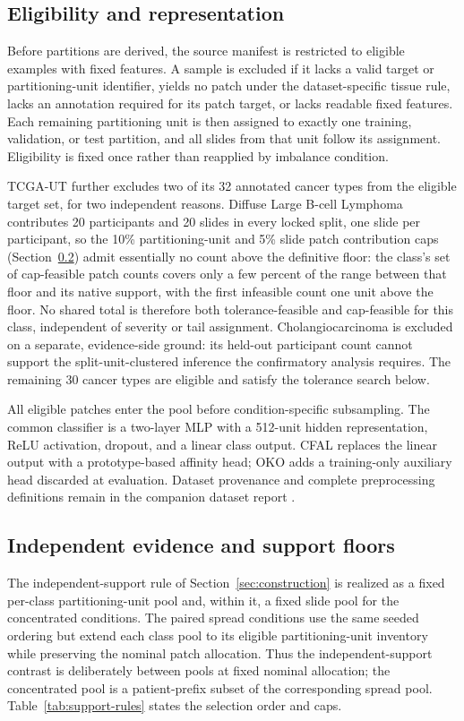 \documentclass[11pt]{article}
\begin{document}
\subsection{Eligibility and representation}
Before partitions are derived, the source manifest is restricted to eligible examples with fixed features. A sample is excluded if it lacks a valid target or partitioning-unit identifier, yields no patch under the dataset-specific tissue rule, lacks an annotation required for its patch target, or lacks readable fixed features. Each remaining partitioning unit is then assigned to exactly one training, validation, or test partition, and all slides from that unit follow its assignment. Eligibility is fixed once rather than reapplied by imbalance condition.

TCGA-UT further excludes two of its 32 annotated cancer types from the eligible target set, for two independent reasons. Diffuse Large B-cell Lymphoma contributes 20 participants and 20 slides in every locked split, one slide per participant, so the 10\% partitioning-unit and 5\% slide patch contribution caps (Section~\ref{app:construction-support}) admit essentially no count above the definitive floor: the class's set of cap-feasible patch counts covers only a few percent of the range between that floor and its native support, with the first infeasible count one unit above the floor. No shared total is therefore both tolerance-feasible and cap-feasible for this class, independent of severity or tail assignment. Cholangiocarcinoma is excluded on a separate, evidence-side ground: its held-out participant count cannot support the split-unit-clustered inference the confirmatory analysis requires. The remaining 30 cancer types are eligible and satisfy the tolerance search below.

All eligible patches enter the pool before condition-specific subsampling. The common classifier is a two-layer MLP with a 512-unit hidden representation, ReLU activation, dropout, and a linear class output. CFAL replaces the linear output with a prototype-based affinity head; OKO adds a training-only auxiliary head discarded at evaluation. Dataset provenance and complete preprocessing definitions remain in the companion dataset report \citep{queisler2026datasets}.

\subsection{Independent evidence and support floors}
\label{app:construction-support}
The independent-support rule of Section~\ref{sec:construction} is realized as a fixed per-class partitioning-unit pool and, within it, a fixed slide pool for the concentrated conditions. The paired spread conditions use the same seeded ordering but extend each class pool to its eligible partitioning-unit inventory while preserving the nominal patch allocation. Thus the independent-support contrast is deliberately between pools at fixed nominal allocation; the concentrated pool is a patient-prefix subset of the corresponding spread pool. Table~\ref{tab:support-rules} states the selection order and caps.
\end{document}
